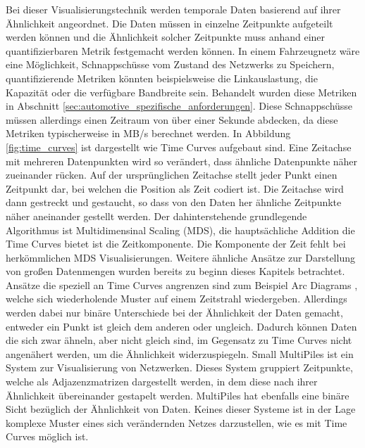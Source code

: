 \documentclass[draft=false
              ,paper=a4
              ,twoside=false
              ,fontsize=11pt
              ,headsepline
              ,BCOR10mm
              ,DIV11
              ]{scrbook}
\begin{document}
Bei dieser Visualisierungstechnik werden temporale Daten basierend auf ihrer Ähnlichkeit angeordnet. Die Daten müssen in einzelne Zeitpunkte aufgeteilt werden können und die Ähnlichkeit solcher Zeitpunkte muss anhand einer quantifizierbaren Metrik festgemacht werden können. In einem Fahrzeugnetz wäre eine Möglichkeit, Schnappschüsse vom Zustand des Netzwerks zu Speichern, quantifizierende Metriken könnten beispielsweise die Linkauslastung, die Kapazität oder die verfügbare Bandbreite sein. Behandelt wurden diese Metriken in Abschnitt \ref{sec:automotive_spezifische_anforderungen}. Diese Schnappschüsse müssen allerdings einen Zeitraum von über einer Sekunde abdecken, da diese Metriken typischerweise in MB/s berechnet werden. In Abbildung \ref{fig:time_curves} ist dargestellt wie Time Curves aufgebaut sind. Eine Zeitachse mit mehreren Datenpunkten wird so verändert, dass ähnliche Datenpunkte näher zueinander rücken. Auf der ursprünglichen Zeitachse stellt jeder Punkt einen Zeitpunkt dar, bei welchen die Position als Zeit codiert ist. Die Zeitachse wird dann gestreckt und gestaucht, so dass von den Daten her ähnliche Zeitpunkte näher aneinander gestellt werden. Der dahinterstehende grundlegende Algorithmus ist Multidimensinal Scaling (MDS), die hauptsächliche Addition die Time Curves bietet ist die Zeitkomponente. Die Komponente der Zeit fehlt bei herkömmlichen MDS Visualisierungen.
Weitere ähnliche Ansätze zur Darstellung von großen Datenmengen wurden bereits zu beginn dieses Kapitels betrachtet. Ansätze die speziell an Time Curves angrenzen sind zum Beispiel Arc Diagrams \cite{wattenberg_arc_2002}, welche sich wiederholende Muster auf einem Zeitstrahl wiedergeben. Allerdings werden dabei nur binäre Unterschiede bei der Ähnlichkeit der Daten gemacht, entweder ein Punkt ist gleich dem anderen oder ungleich. Dadurch können Daten die sich zwar ähneln, aber nicht gleich sind, im Gegensatz zu Time Curves nicht angenähert werden, um die Ähnlichkeit widerzuspiegeln. Small MultiPiles \cite{bach_small_2015} ist ein System zur Visualisierung von Netzwerken. Dieses System gruppiert Zeitpunkte, welche als Adjazenzmatrizen dargestellt werden, in dem diese nach ihrer Ähnlichkeit übereinander gestapelt werden. MultiPiles hat ebenfalls eine binäre Sicht bezüglich der Ähnlichkeit von Daten. Keines dieser Systeme ist in der Lage komplexe Muster eines sich verändernden Netzes darzustellen, wie es mit Time Curves möglich ist. %
\end{document}

